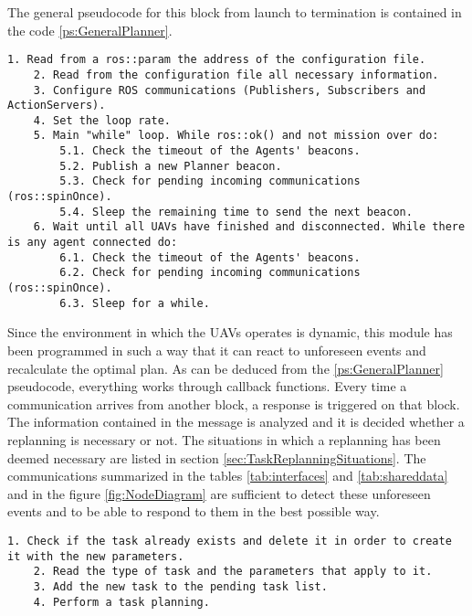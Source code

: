 The general pseudocode for this block from launch to termination is contained in the code \ref{ps:GeneralPlanner}.

\begin{lstlisting}[caption={General operation of \emph{High-Level Planner}'s code}, breaklines=true, label=ps:GeneralPlanner]
	1. Read from a ros::param the address of the configuration file.
	2. Read from the configuration file all necessary information.
	3. Configure ROS communications (Publishers, Subscribers and ActionServers).
	4. Set the loop rate.
	5. Main "while" loop. While ros::ok() and not mission over do:
		5.1. Check the timeout of the Agents' beacons.
		5.2. Publish a new Planner beacon.
		5.3. Check for pending incoming communications (ros::spinOnce).
		5.4. Sleep the remaining time to send the next beacon.
	6. Wait until all UAVs have finished and disconnected. While there is any agent connected do:
		6.1. Check the timeout of the Agents' beacons.
		6.2. Check for pending incoming communications (ros::spinOnce).
		6.3. Sleep for a while.
\end{lstlisting}

Since the environment in which the \glspl{UAV} operates is dynamic, this module has been programmed in such a way that it can react to unforeseen events and recalculate the optimal plan. As can be deduced from the \ref{ps:GeneralPlanner} pseudocode, everything works through callback functions. Every time a communication arrives from another block, a response is triggered on that block. The information contained in the message is analyzed and it is decided whether a replanning is necessary or not. The situations in which a replanning has been deemed necessary are listed in section \ref{sec:TaskReplanningSituations}. The communications summarized in the tables \ref{tab:interfaces} and \ref{tab:shareddata} and in the figure \ref{fig:NodeDiagram} are sufficient to detect these unforeseen events and to be able to respond to them in the best possible way.

\begin{lstlisting}[caption={Task callback pseudocode}, breaklines=true, label=ps:IncomingTask]
	1. Check if the task already exists and delete it in order to create it with the new parameters.
	2. Read the type of task and the parameters that apply to it.
	3. Add the new task to the pending task list.
	4. Perform a task planning.
\end{lstlisting}

